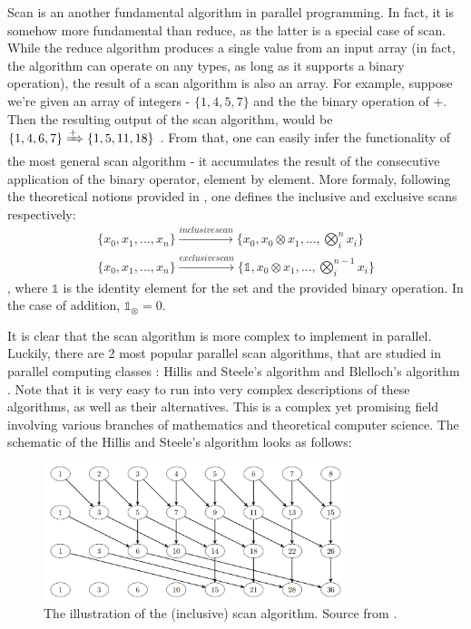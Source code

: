 Scan is an another fundamental algorithm in parallel programming. In fact, it is somehow more fundamental than reduce, as the latter is a special case of scan. 
While the reduce algorithm produces a single value from an input array (in fact, the algorithm can operate on any types, as long as it supports a binary operation), 
the result of a scan algorithm is also an array. For example, suppose we're given an array of integers - $\{ 1, 4, 5, 7\}$ and the the binary operation of $+$. Then 
the resulting output of the scan algorithm, would be $\{ 1, 4, 6, 7\} \xRightarrow{+}  \{1, 5, 11, 18\}$ \cite{reeves_ams_nodate}. From that, one can easily 
infer the functionality of the most general scan algorithm - it accumulates the result of the consecutive application of the binary operator, element by element.
More formaly, following the theoretical notions provided in \cite{reeves_ams_nodate}, one defines the inclusive and exclusive scans respectively: 
\begin{align}
  \{x_0, x_1,..., x_n\} \xrightarrow{inclusive scan} \{x_0, x_0 \otimes x_1, ..., \bigotimes^{n}_{i}x_i \}\\
  \{x_0, x_1,..., x_n\} \xrightarrow{exclusive scan} \{\mathds{1}, x_0 \otimes x_1, ..., \bigotimes^{n-1}_{i}x_i \}
\end{align}
, where $\mathds{1}$ is the identity element for the set and the provided binary operation. In the case of addition, $\mathds{1}_{\otimes} = 0$. 

It is clear that the scan algorithm is more complex to implement in parallel. Luckily, there are 2 most popular 
parallel scan algorithms, that are studied in parallel computing classes : Hillis and Steele's algorithm and Blelloch's algorithm \cite{noauthor_prefix_2022}. 
Note that it is very easy to run into very complex descriptions of these algorithms, as well as their alternatives. This is a complex yet promising field 
involving various branches of mathematics and theoretical computer science.
The schematic of the Hillis and Steele's algorithm looks as follows: 

\begin{figure}[ht!]
  \centering
  \includegraphics[width=0.8\textwidth]{pngs/hillis_steele.png}
  \caption{The illustration of the (inclusive) scan algorithm. Source from \cite{reeves_ams_nodate}.}
  \label{fig:hillis_steele}
\end{figure}

